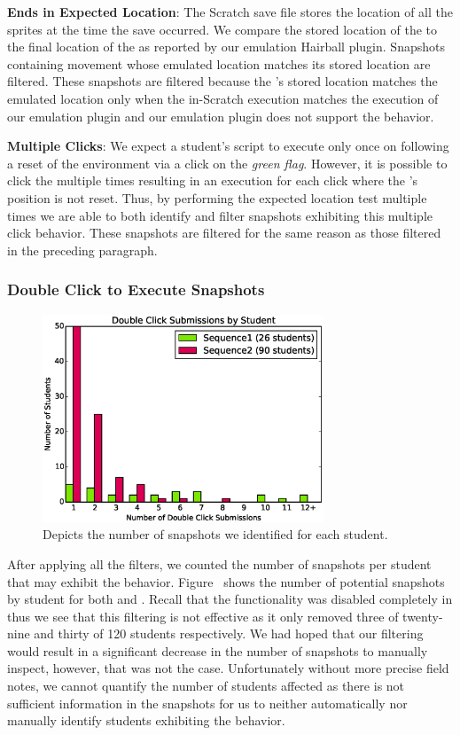 \textbf{\net{} Ends in Expected Location}: The Scratch save file stores the
location of all the sprites at the time the save occurred. We compare the
stored location of the \net{} to the final location of the \net{} as reported
by our \net{} emulation Hairball plugin. Snapshots containing movement whose
emulated \net{} location matches its stored location are filtered. These
snapshots are filtered because the \net{}'s stored location matches the
emulated location only when the in-Scratch execution matches the execution of
our emulation plugin and our emulation plugin does not support the \dce{}
behavior.

\textbf{Multiple \net{} Clicks}: We expect a student's script to execute only
once on \netclicked{} following a reset of the environment via a click on the
\emph{green flag}. However, it is possible to click the \net{} multiple times
resulting in an execution for each click where the \net{}'s position is not
reset. Thus, by performing the expected location test multiple times we are
able to both identify and filter snapshots exhibiting this multiple \net{}
click behavior. These snapshots are filtered for the same reason as those
filtered in the preceding paragraph.

\subsubsection{Double Click to Execute Snapshots}

\begin{figure}[!t]
\centering \includegraphics[width=3.3in]{graphs/dc_submissions.eps}
\caption{Depicts the number of \dce{} snapshots we identified for each
  student.}
\end{figure}

After applying all the filters, we counted the number of snapshots per student
that may exhibit the \dce{} behavior. Figure~ shows
the number of potential snapshots by student for both \sone{} and
\stwo{}. Recall that the \dce{} functionality was disabled completely in
\stwo{} thus we see that this filtering is not effective as it only removed
three of twenty-nine and thirty of 120 students respectively. We had hoped that
our filtering would result in a significant decrease in the number of snapshots
to manually inspect, however, that was not the case. Unfortunately without more
precise field notes, we cannot quantify the number of students affected as
there is not sufficient information in the snapshots for us to neither
automatically nor manually identify students exhibiting the \dce{} behavior.


